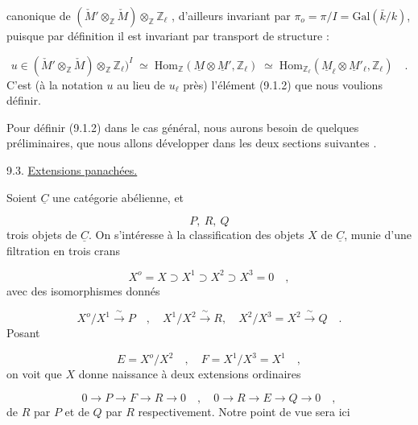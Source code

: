 
canonique de $(\check{M}'\otimes_{\mathbb{Z}}\check{M})\otimes_{\mathbb{Z}}\mathbb{Z}_\ell$ , d'ailleurs invariant par $\pi_o=\pi/I=\mathrm{Gal}(\bar{k}/k)$, puisque par définition il est invariant par transport de structure :

\begin{equation}\tag{9.2.9}
u \in (\check{M}'\otimes_{\mathbb{Z}}\check{M})\otimes_{\mathbb{Z}}\mathbb{Z}_\ell)^I \;\simeq\; \mathrm{Hom}_{\mathbb{Z}}(\underline{M}\otimes\underline{M}',\mathbb{Z}_\ell) \;\simeq\; \mathrm{Hom}_{\mathbb{Z}_\ell}(\underline{M}_\ell\otimes\underline{M}'_\ell,\mathbb{Z}_\ell) \quad .
\end{equation}
C'est (à la notation $u$ au lieu de $u_\ell$ près) l'élément (9.1.2) que nous voulions définir.

Pour définir (9.1.2) dans le cas général, nous aurons besoin de quelques préliminaires, que nous allons développer dans les deux sections suivantes .


9.3. \underline{Extensions panachées.}

Soient $\underline{C}$ une catégorie abélienne, et

\begin{equation}\tag{9.3.1}
P,\ R,\ Q
\end{equation}
trois objets de $\underline{C}$. On s'intéresse à la classification des objets $X$ de $\underline{C}$, munie d'une filtration en trois crans

\begin{equation}\tag{*}
X^o = X \supset X^1 \supset X^2 \supset X^3 = 0 \quad ,
\end{equation}
avec des isomorphismes donnés

\begin{equation*}
X^o/X^1 \xrightarrow{\ \sim\ } P \quad , \quad X^1/X^2 \xrightarrow{\ \sim\ } R, \quad X^2/X^3 = X^2 \xrightarrow{\ \sim\ } Q \quad .
\end{equation*}
Posant

\begin{equation*}
E = X^o/X^2 \quad , \quad F = X^1/X^3 = X^1 \quad ,
\end{equation*}
on voit que $X$ donne naissance à deux extensions ordinaires

\begin{equation}\tag{9.3.2}
0 \longrightarrow P \longrightarrow F \longrightarrow R \longrightarrow 0 \quad , \quad 0 \longrightarrow R \longrightarrow E \longrightarrow Q \longrightarrow 0 \quad ,
\end{equation}
de $R$ par $P$ et de $Q$ par $R$ respectivement. Notre point de vue sera ici


